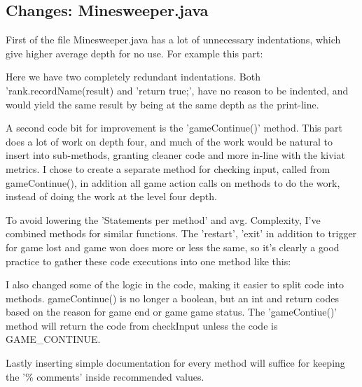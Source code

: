 \documentclass[UKenglish]{article}  %
\begin{document}
\subsection{Changes: Minesweeper.java}
First of the file Minesweeper.java has a lot of unnecessary indentations, which
give higher average depth for no use. For example this part:



Here we have two completely redundant indentations. Both 
'rank.recordName(result) and 'return true;', have no reason to be indented, and 
would yield the same result by being at the same depth as the print-line. 

A second code bit for improvement is the 'gameContinue()' method. This part does
a lot of work on depth four, and much of the work would be natural to insert
into sub-methods, granting cleaner code and more in-line with the kiviat
metrics. I chose to create a separate method for checking input, called from
gameContinue(), in addition all game action calls on methods to do the work,
instead of doing the work at the level four depth. 

To avoid lowering the 'Statements per method' and avg. Complexity, I've
combined methods for similar functions. The 'restart', 'exit' in addition to
trigger for game lost and game won does more or less the same, so it's clearly a
good practice to gather these code executions into one method like this: 



I also changed some of the logic in the code, making it easier to split code
into methods. gameContinue() is no longer a boolean, but an int and return codes
based on the reason for game end or game game status. The 'gameContiue()' method
will return the code from checkInput unless the code is GAME\_CONTINUE.



Lastly inserting simple documentation for every method will suffice for keeping
the '\% comments' inside recommended values.
\end{document}
